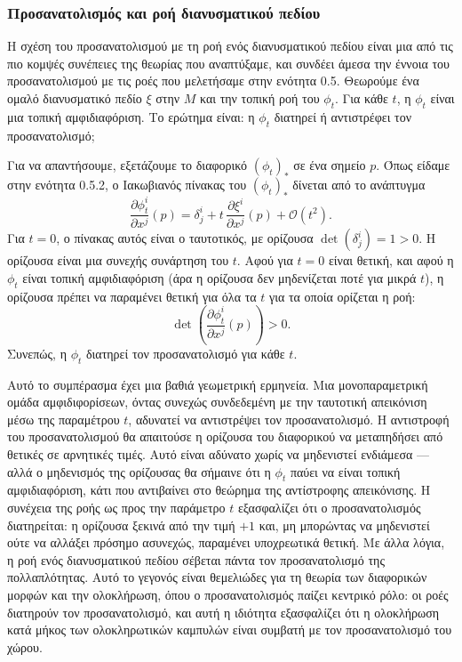 \documentclass[11pt,a4paper,twoside,openright]{book}
\begin{document}
\subsubsection{Προσανατολισμός και ροή διανυσματικού πεδίου}

Η σχέση του προσανατολισμού με τη ροή ενός διανυσματικού πεδίου είναι μια από τις πιο κομψές συνέπειες της θεωρίας που αναπτύξαμε, και συνδέει άμεσα την έννοια του προσανατολισμού με τις ροές που μελετήσαμε στην ενότητα 0.5. Θεωρούμε ένα ομαλό διανυσματικό πεδίο $\xi$ στην $M$ και την τοπική ροή του $\phi_t$. Για κάθε $t$, η $\phi_t$ είναι μια τοπική αμφιδιαφόριση. Το ερώτημα είναι: η $\phi_t$ διατηρεί ή αντιστρέφει τον προσανατολισμό;

Για να απαντήσουμε, εξετάζουμε το διαφορικό $(\phi_t)_*$ σε ένα σημείο $p$. Όπως είδαμε στην ενότητα 0.5.2, ο Ιακωβιανός πίνακας του $(\phi_t)_*$ δίνεται από το ανάπτυγμα
\[
\frac{\partial \phi_t^i}{\partial x^j}(p) = \delta^i_j + t \, \frac{\partial \xi^i}{\partial x^j}(p) + \mathcal{O}(t^2).
\]
Για $t = 0$, ο πίνακας αυτός είναι ο ταυτοτικός, με ορίζουσα $\det(\delta^i_j) = 1 > 0$. Η ορίζουσα είναι μια συνεχής συνάρτηση του $t$. Αφού για $t = 0$ είναι θετική, και αφού η $\phi_t$ είναι τοπική αμφιδιαφόριση (άρα η ορίζουσα δεν μηδενίζεται ποτέ για μικρά $t$), η ορίζουσα πρέπει να παραμένει θετική για όλα τα $t$ για τα οποία ορίζεται η ροή:
\[
\det \left( \frac{\partial \phi_t^i}{\partial x^j}(p) \right) > 0.
\]
Συνεπώς, η $\phi_t$ διατηρεί τον προσανατολισμό για κάθε $t$.

Αυτό το συμπέρασμα έχει μια βαθιά γεωμετρική ερμηνεία. Μια μονοπαραμετρική ομάδα αμφιδιφορίσεων, όντας συνεχώς συνδεδεμένη με την ταυτοτική απεικόνιση μέσω της παραμέτρου $t$, αδυνατεί να αντιστρέψει τον προσανατολισμό. Η αντιστροφή του προσανατολισμού θα απαιτούσε η ορίζουσα του διαφορικού να μεταπηδήσει από θετικές σε αρνητικές τιμές. Αυτό είναι αδύνατο χωρίς να μηδενιστεί ενδιάμεσα --- αλλά ο μηδενισμός της ορίζουσας θα σήμαινε ότι η $\phi_t$ παύει να είναι τοπική αμφιδιαφόριση, κάτι που αντιβαίνει στο θεώρημα της αντίστροφης απεικόνισης. Η συνέχεια της ροής ως προς την παράμετρο $t$ εξασφαλίζει ότι ο προσανατολισμός διατηρείται: η ορίζουσα ξεκινά από την τιμή $+1$ και, μη μπορώντας να μηδενιστεί ούτε να αλλάξει πρόσημο ασυνεχώς, παραμένει υποχρεωτικά θετική. Με άλλα λόγια, η ροή ενός διανυσματικού πεδίου σέβεται πάντα τον προσανατολισμό της πολλαπλότητας. Αυτό το γεγονός είναι θεμελιώδες για τη θεωρία των διαφορικών μορφών και την ολοκλήρωση, όπου ο προσανατολισμός παίζει κεντρικό ρόλο: οι ροές διατηρούν τον προσανατολισμό, και αυτή η ιδιότητα εξασφαλίζει ότι η ολοκλήρωση κατά μήκος των ολοκληρωτικών καμπυλών είναι συμβατή με τον προσανατολισμό του χώρου.
\end{document}

